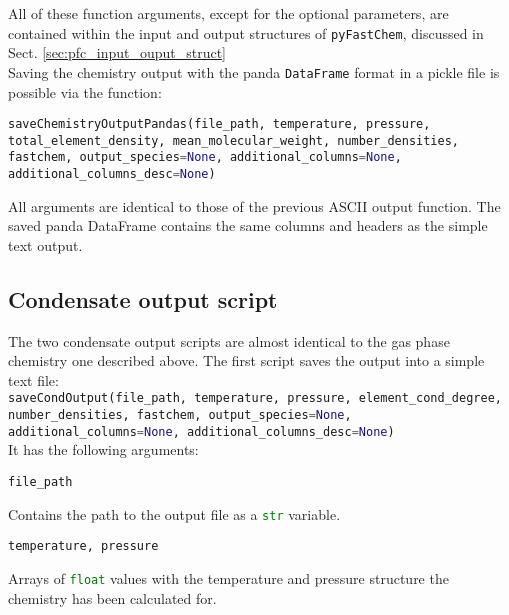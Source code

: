 \documentclass[numbers=noenddot]{aux/fcmanual}
\newcommand{\pfc}{\texttt{pyFastChem}\xspace}
\begin{document}
\bigbreak

All of these function arguments, except for the optional parameters, are contained within the input and output structures of \pfc, discussed in Sect. \ref{sec:pfc_input_ouput_struct}\\

Saving the chemistry output with the panda \lstinline[language=Python]!DataFrame! format in a pickle file is possible via the function:

\bigbreak

\lstinline[language=Python, breaklines, breakatwhitespace]!saveChemistryOutputPandas(file_path, temperature, pressure, total_element_density, mean_molecular_weight, number_densities, fastchem, output_species=None, additional_columns=None, additional_columns_desc=None)!

\bigbreak

All arguments are identical to those of the previous ASCII output function. The saved panda DataFrame contains the same columns and headers as the simple text output.



\subsection{Condensate output script}

The two condensate output scripts are almost identical to the gas phase chemistry one described above. The first script saves the output into a simple text file:\\

\lstinline[language=Python, breaklines, breakatwhitespace]!saveCondOutput(file_path, temperature, pressure, element_cond_degree, number_densities, fastchem, output_species=None, additional_columns=None, additional_columns_desc=None)!\\

It has the following arguments:

\bigbreak

\lstinline[language=Python]!file_path!
\begin{addmargin}[25pt]{0pt}
	Contains the path to the output file as a \lstinline[language=Python]!str! variable.
\end{addmargin}


\bigbreak

\lstinline[language=Python]!temperature, pressure!
\begin{addmargin}[25pt]{0pt}
	Arrays of \lstinline[language=Python]!float! values with the temperature and pressure structure the chemistry has been calculated for.
\end{addmargin}
\end{document}
